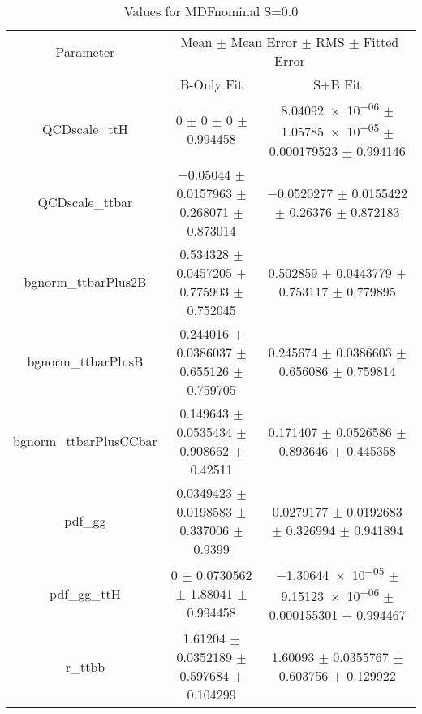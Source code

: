\begin{table}
\centering
\caption{Values for MDFnominal S=0.0}
\begin{tabular}{ccc}
\toprule
Parameter & \multicolumn{2}{c}{Mean $\pm$ Mean Error $\pm$ RMS $\pm$ Fitted Error}\\
 & B-Only Fit & S+B Fit\\
\midrule
QCDscale\_ttH & \num{0} $\pm$ \num{0} $\pm$ \num{0} $\pm$ \num{0.994458} & \num{8.04092e-06} $\pm$ \num{1.05785e-05} $\pm$ \num{0.000179523} $\pm$ \num{0.994146}\\
QCDscale\_ttbar & \num{-0.05044} $\pm$ \num{0.0157963} $\pm$ \num{0.268071} $\pm$ \num{0.873014} & \num{-0.0520277} $\pm$ \num{0.0155422} $\pm$ \num{0.26376} $\pm$ \num{0.872183}\\
bgnorm\_ttbarPlus2B & \num{0.534328} $\pm$ \num{0.0457205} $\pm$ \num{0.775903} $\pm$ \num{0.752045} & \num{0.502859} $\pm$ \num{0.0443779} $\pm$ \num{0.753117} $\pm$ \num{0.779895}\\
bgnorm\_ttbarPlusB & \num{0.244016} $\pm$ \num{0.0386037} $\pm$ \num{0.655126} $\pm$ \num{0.759705} & \num{0.245674} $\pm$ \num{0.0386603} $\pm$ \num{0.656086} $\pm$ \num{0.759814}\\
bgnorm\_ttbarPlusCCbar & \num{0.149643} $\pm$ \num{0.0535434} $\pm$ \num{0.908662} $\pm$ \num{0.42511} & \num{0.171407} $\pm$ \num{0.0526586} $\pm$ \num{0.893646} $\pm$ \num{0.445358}\\
pdf\_gg & \num{0.0349423} $\pm$ \num{0.0198583} $\pm$ \num{0.337006} $\pm$ \num{0.9399} & \num{0.0279177} $\pm$ \num{0.0192683} $\pm$ \num{0.326994} $\pm$ \num{0.941894}\\
pdf\_gg\_ttH & \num{0} $\pm$ \num{0.0730562} $\pm$ \num{1.88041} $\pm$ \num{0.994458} & \num{-1.30644e-05} $\pm$ \num{9.15123e-06} $\pm$ \num{0.000155301} $\pm$ \num{0.994467}\\
r\_ttbb & \num{1.61204} $\pm$ \num{0.0352189} $\pm$ \num{0.597684} $\pm$ \num{0.104299} & \num{1.60093} $\pm$ \num{0.0355767} $\pm$ \num{0.603756} $\pm$ \num{0.129922}\\
\bottomrule
\end{tabular}
\end{table}